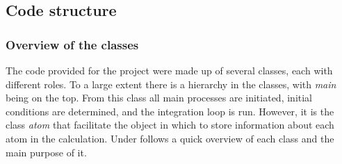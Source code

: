 \subsection{Code structure}

\subsubsection{Overview of the classes}
The code provided for the project were made up of several classes, each with different roles. To a large extent there is a hierarchy in the classes, with  \textit{main} being on the top. From this class all main processes are initiated, initial conditions are determined, and the integration loop is run. However, it is the class \textit{atom} that facilitate the object in which to store information about each atom in the calculation. Under follows a quick overview of each class and the main purpose of it. 
		
